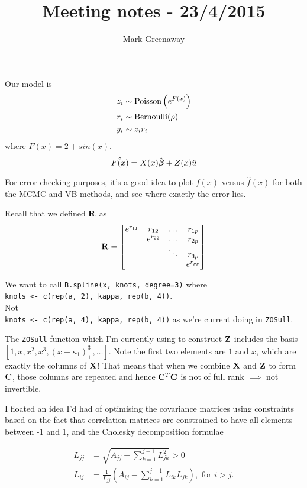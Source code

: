 \documentclass{article}[12pt]
\title{Meeting notes - 23/4/2015}
\author{Mark Greenaway}
\begin{document}
\maketitle

\noindent Our model is
\begin{align*}
	z_i &\sim \text{Poisson} \left(e^{F(x)}\right) \\
	r_i &\sim \text{Bernoulli} (\rho) \\
	y_i &\sim z_i r_i
\end{align*}
where $F(x) = 2 + sin(x)$.
\[
	\hat{F(x)} = X(x) \hat{{\boldsymbol \beta}} + Z(x) \hat{u}
\]

\noindent For error-checking purposes, it's a good idea to plot $f(x)$ versus $\hat{f}(x)$ for both 
the MCMC and VB methods, and see where exactly the error lies.

\noindent Recall that we defined ${\bf R}$ as
\[
	{\bf R} = \begin{bmatrix}
		e^{r_{11}} & r_{12} & \ldots & r_{1p} \\
		& e^{r_{22}} & \ldots & r_{2p} \\
		& & \ddots & r_{3p} \\
		& & & e^{r_{pp}}
	\end{bmatrix}
\]

\noindent We want to call \texttt{B.spline(x, knots, degree=3)} where \\
\texttt{knots <- c(rep(a, 2), kappa, rep(b, 4))}. \\
Not \\
\texttt{knots <- c(rep(a, 4), kappa, rep(b, 4))} as we're current doing in \texttt{ZOSull}.



\noindent The \texttt{ZOSull} function which I'm currently using to construct ${\bf Z}$ includes the 
basis $\left[ 1, x, x^2, x^3, (x - \kappa_1)_+^3, \ldots \right]$. Note the first two elements are
$1$ and $x$, which are exactly the columns of ${\bf X}$! That means that when we combine ${\bf X}$ and
${\bf Z}$ to form ${\bf C}$, those columns are repeated and hence ${\bf C}^T {\bf C}$ is not of full rank $\implies$
not invertible.

\noindent I floated an idea I'd had of optimising the covariance matrices using constraints based
on the fact that correlation matrices are constrained to have all elements between -1 and 1,
and the Cholesky decomposition formulae

\begin{align*}
	L_{jj} &= \sqrt{A_{jj} - \sum_{k=1}^{j-1} L_{jk}^2} > 0 \\
	L_{ij} &= \frac{1}{L_{jj}}\left(A_{ij} - \sum_{k=1}^{j-1} L_{ik} L_{jk}\right), \text{ for } i > j.
\end{align*}
\end{document}
